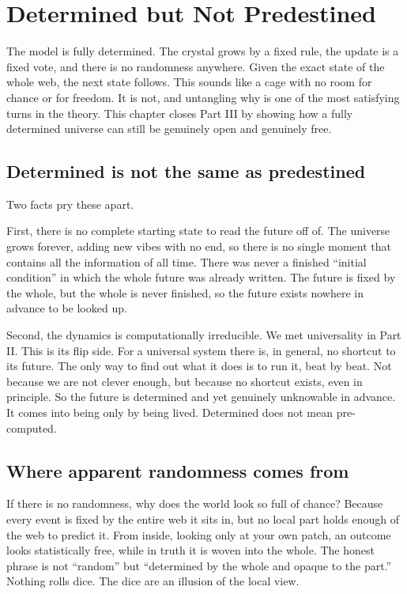 \section{Determined but Not Predestined}

The model is fully determined. The crystal grows by a fixed rule, the update is a fixed vote, and there is no randomness anywhere. Given the exact state of the whole web, the next state follows. This sounds like a cage with no room for chance or for freedom. It is not, and untangling why is one of the most satisfying turns in the theory. This chapter closes Part III by showing how a fully determined universe can still be genuinely open and genuinely free.

\subsection{Determined is not the same as predestined}

Two facts pry these apart.

First, there is no complete starting state to read the future off of. The universe grows forever, adding new vibes with no end, so there is no single moment that contains all the information of all time. There was never a finished ``initial condition'' in which the whole future was already written. The future is fixed by the whole, but the whole is never finished, so the future exists nowhere in advance to be looked up.

Second, the dynamics is computationally irreducible. We met universality in Part II. This is its flip side. For a universal system there is, in general, no shortcut to its future. The only way to find out what it does is to run it, beat by beat. Not because we are not clever enough, but because no shortcut exists, even in principle. So the future is determined and yet genuinely unknowable in advance. It comes into being only by being lived. Determined does not mean pre-computed.

\subsection{Where apparent randomness comes from}

If there is no randomness, why does the world look so full of chance? Because every event is fixed by the entire web it sits in, but no local part holds enough of the web to predict it. From inside, looking only at your own patch, an outcome looks statistically free, while in truth it is woven into the whole. The honest phrase is not ``random'' but ``determined by the whole and opaque to the part.'' Nothing rolls dice. The dice are an illusion of the local view.

